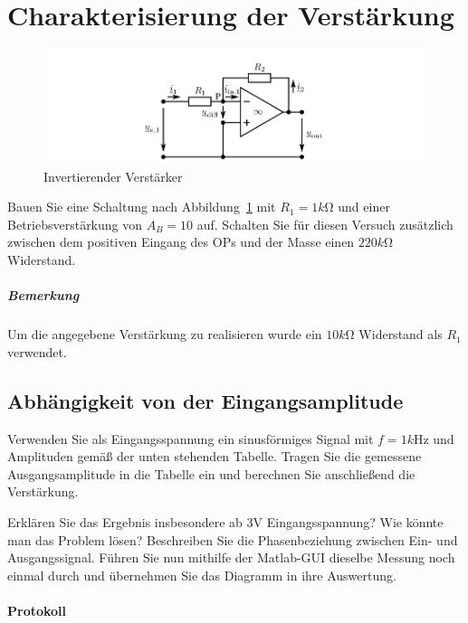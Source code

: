 \documentclass[10pt]{scrreprt}
\begin{document}
    \section{Charakterisierung der Verstärkung}
    \begin{center}
        \begin{figure}[H]
            \includegraphics[width=\textwidth]{abb8.png}
            \caption{Invertierender Verstärker}
            \label{fig:abb8}
        \end{figure}
    \end{center}
    Bauen Sie eine Schaltung nach Abbildung~\ref{fig:abb8} mit $R_1 = 1\si{k\ohm}$ und einer Betriebsverstärkung
    von $A_B = 10$ auf. Schalten Sie für diesen Versuch zusätzlich zwischen dem positiven
    Eingang des OPs und der Masse einen $220\si{k\ohm}$ Widerstand.

    \subparagraph{Bemerkung}
    Um die angegebene Verstärkung zu realisieren wurde ein $10\si{k\ohm}$ Widerstand
    als $R_1$ verwendet.




    \subsection{Abhängigkeit von der Eingangsamplitude}
    Verwenden Sie als Eingangsspannung ein sinusförmiges Signal mit $f = 1\si{k\hertz}$ und
    Amplituden gemäß der unten stehenden Tabelle. Tragen Sie die gemessene Ausgangsamplitude
    in die Tabelle ein und berechnen Sie anschließend die Verstärkung.

    Erklären Sie das Ergebnis insbesondere ab $3\si{\volt}$ Eingangsspannung? Wie könnte man das
    Problem lösen? Beschreiben Sie die Phasenbeziehung zwischen Ein- und Ausgangssignal.
    Führen Sie nun mithilfe der Matlab-GUI dieselbe Messung noch einmal durch und
    übernehmen Sie das Diagramm in ihre Auswertung.

    \paragraph{Protokoll}
    $ $
\end{document}

